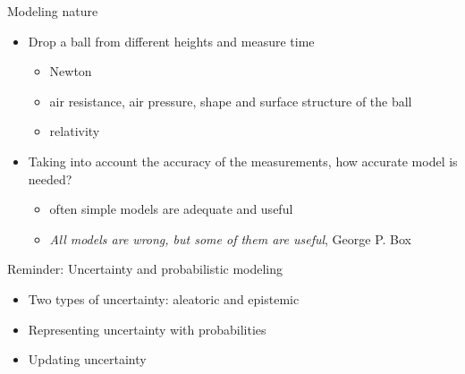 \documentclass[english,t]{beamer}
\begin{document}
\begin{frame}{Modeling nature}

  \begin{itemize}
  \item Drop a ball from different heights and measure time
    \pause
    \begin{itemize}
    \item Newton
    \item air resistance, air pressure, shape and surface structure of the ball
    \item relativity
    \end{itemize}
    \pause
  \item Taking into account the accuracy of the measurements, how
    accurate model is needed?
    \pause
    \begin{itemize}
    \item often simple models are adequate and useful
    \item \emph{All models are wrong, but some of them are useful},
      George P. Box
    \end{itemize}
  \end{itemize}

\end{frame}

\begin{frame}{Reminder: Uncertainty and probabilistic modeling}

  \begin{itemize}
  \item Two types of uncertainty: aleatoric and epistemic
    \vspace{\baselineskip}
  \item Representing uncertainty with probabilities
    \vspace{\baselineskip}
  \item Updating uncertainty
    \vspace{\baselineskip}
   \end{itemize}
\end{frame}
\end{document}
